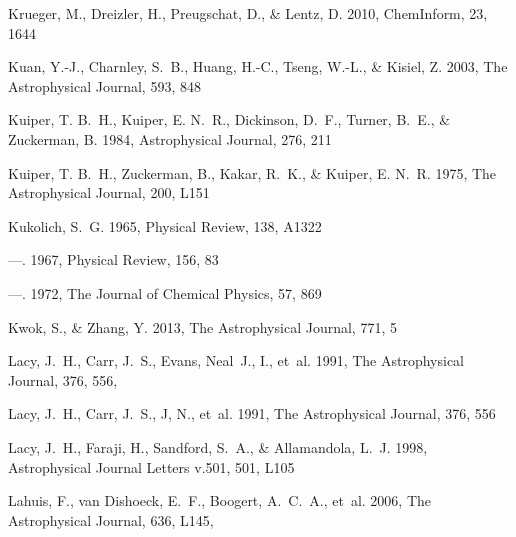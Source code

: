 \documentclass[twocolumn]{aastex631}
\begin{document}
\begin{thebibliography}{}
Krueger, M., Dreizler, H., Preugschat, D., \& Lentz, D. 2010, ChemInform, 23,
  1644

Kuan, Y.-J., Charnley, S.~B., Huang, H.-C., Tseng, W.-L., \& Kisiel, Z. 2003,
  The Astrophysical Journal, 593, 848

Kuiper, T. B.~H., Kuiper, E. N.~R., Dickinson, D.~F., Turner, B.~E., \&
  Zuckerman, B. 1984, Astrophysical Journal, 276, 211

Kuiper, T. B.~H., Zuckerman, B., Kakar, R.~K., \& Kuiper, E. N.~R. 1975, The
  Astrophysical Journal, 200, L151

Kukolich, S.~G. 1965, Physical Review, 138, A1322

---. 1967, Physical Review, 156, 83

---. 1972, The Journal of Chemical Physics, 57, 869

Kwok, S., \& Zhang, Y. 2013, The Astrophysical Journal, 771, 5

{Lacy}, J.~H., {Carr}, J.~S., {Evans}, Neal~J., I., {et~al.} 1991, The
  Astrophysical Journal, 376, 556, 

Lacy, J.~H., Carr, J.~S., J, N., {et~al.} 1991, The Astrophysical Journal, 376,
  556

Lacy, J.~H., Faraji, H., Sandford, S.~A., \& Allamandola, L.~J. 1998,
  Astrophysical Journal Letters v.501, 501, L105

{Lahuis}, F., {van Dishoeck}, E.~F., {Boogert}, A.~C.~A., {et~al.} 2006, The
  Astrophysical Journal, 636, L145, 


\end{thebibliography}
\end{document}
